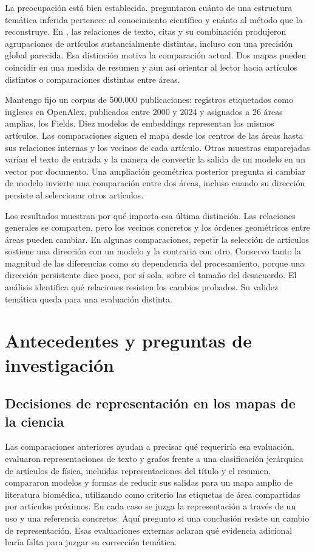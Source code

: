 \documentclass[12pt]{article}
\begin{document}
La preocupación está bien establecida. \citet{refa0d2d707e6} preguntaron cuánto de una estructura temática inferida pertenece al conocimiento científico y cuánto al método que la reconstruye. En \citet{ref6a2f5912bc}, las relaciones de texto, citas y su combinación produjeron agrupaciones de artículos sustancialmente distintas, incluso con una precisión global parecida. Esa distinción motiva la comparación actual. Dos mapas pueden coincidir en una medida de resumen y aun así orientar al lector hacia artículos distintos o comparaciones distintas entre áreas.

Mantengo fijo un corpus de 500.000 publicaciones: registros etiquetados como ingleses en OpenAlex, publicados entre 2000 y 2024 y asignados a 26 áreas amplias, los Fields. Diez modelos de embeddings representan los mismos artículos. Las comparaciones siguen el mapa desde los centros de las áreas hasta sus relaciones internas y los vecinos de cada artículo. Otras muestras emparejadas varían el texto de entrada y la manera de convertir la salida de un modelo en un vector por documento. Una ampliación geométrica posterior pregunta si cambiar de modelo invierte una comparación entre dos áreas, incluso cuando su dirección persiste al seleccionar otros artículos.

Los resultados muestran por qué importa esa última distinción. Las relaciones generales se comparten, pero los vecinos concretos y los órdenes geométricos entre áreas pueden cambiar. En algunas comparaciones, repetir la selección de artículos sostiene una dirección con un modelo y la contraria con otro. Conservo tanto la magnitud de las diferencias como su dependencia del procesamiento, porque una dirección persistente dice poco, por sí sola, sobre el tamaño del desacuerdo. El análisis identifica qué relaciones resisten los cambios probados. Su validez temática queda para una evaluación distinta.

\section{Antecedentes y preguntas de investigación}
\subsection{Decisiones de representación en los mapas de la ciencia}
Las comparaciones anteriores ayudan a precisar qué requeriría esa evaluación. \citet{refc0e2cc29e0} evaluaron representaciones de texto y grafos frente a una clasificación jerárquica de artículos de física, incluidas representaciones del título y el resumen. \citet{refbe130e2973} compararon modelos y formas de reducir sus salidas para un mapa amplio de literatura biomédica, utilizando como criterio las etiquetas de área compartidas por artículos próximos. En cada caso se juzga la representación a través de un uso y una referencia concretos. Aquí pregunto si una conclusión resiste un cambio de representación. Esas evaluaciones externas aclaran qué evidencia adicional haría falta para juzgar su corrección temática.
\end{document}
